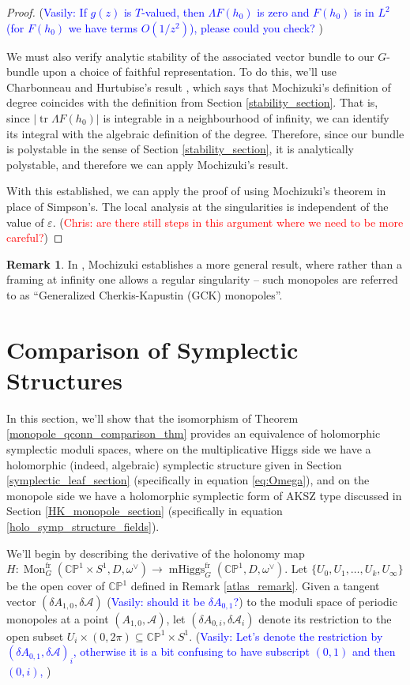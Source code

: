 \documentclass[11pt, oneside, reqno]{amsart}
\theoremstyle{definition} \newtheorem{definition}{Definition}[section]
\theoremstyle{definition} \newtheorem{remark}[definition]{Remark}
\theoremstyle{definition} \newtheorem{remarks}[definition]{Remarks}
\theoremstyle{definition} \newtheorem{question}[definition]{Question}
\theoremstyle{definition} \newtheorem*{note}{Note}
\theoremstyle{definition} \newtheorem{example}[definition]{Example}
\theoremstyle{definition} \newtheorem{examples}[definition]{Examples}
\newcommand{\bb}[1]{\mathbb{#1}}
\newcommand{\mc}[1]{\mathcal{#1}}
\newcommand{\eps}{\varepsilon}
\newcommand{\sub}{\subseteq}
\DeclareMathOperator{\tr}{tr}
\DeclareMathOperator{\mhiggs}{mHiggs}
\DeclareMathOperator{\mon}{Mon}
\newcommand{\fr}{\mathrm{fr}}
\newcommand{\chris}[1]{(\textcolor{red}{Chris: #1})}
\newcommand{\vasily}[1]{(\textcolor{blue}{Vasily: #1})}
\begin{document}
\begin{proof}
\vasily{If $g(z)$ is $T$-valued, then $\Lambda F(h_0)$ is zero and $ F(h_0)$ is in $L^2$ (for $F(h_0)$ we have terms $O(1/z^2)$), please could you check?  } 

We must also verify analytic stability of the associated vector bundle to our $G$-bundle upon a choice of faithful representation.  To do this, we'll use Charbonneau and Hurtubise's result \cite[Lemma 4.5]{CharbonneauHurtubise}, which says that Mochizuki's definition of degree coincides with the definition from Section \ref{stability_section}.  That is, since $|\tr \Lambda F(h_0)|$ is integrable in a neighbourhood of infinity, we can identify its integral with the algebraic definition of the degree.  Therefore, since our bundle is polystable in the sense of Section \ref{stability_section}, it is analytically polystable, and therefore we can apply Mochizuki's result.

With this established, we can apply the proof of \cite[Proposition 5.2]{Smith} using Mochizuki's theorem in place of Simpson's.  The local analysis at the singularities is independent of the value of $\eps$.
\chris{are there still steps in this argument where we need to be more careful?}
\end{proof}

\begin{remark}
In \cite{Mochizuki}, Mochizuki establishes a more general result, where rather than a framing at infinity one allows a regular singularity -- such monopoles are referred to as ``Generalized Cherkis-Kapustin (GCK) monopoles''.
\end{remark}

\section{Comparison of Symplectic Structures} \label{symp_comparison_section}

In this section, we'll show that the isomorphism of Theorem \ref{monopole_qconn_comparison_thm} provides an equivalence of holomorphic symplectic moduli spaces, where on the multiplicative Higgs side we have a holomorphic (indeed, algebraic) symplectic structure given in Section \ref{symplectic_leaf_section} (specifically in equation \ref{eq:Omega}), and on the monopole side we have a holomorphic symplectic form of AKSZ type discussed in Section \ref{HK_monopole_section} (specifically in equation \ref{holo_symp_structure_fields}).

We'll begin by describing the derivative of the holonomy map $H \colon \mon_G^\fr(\bb{CP}^1 \times S^1, D, \omega^\vee) \to \mhiggs^\fr_G(\bb{CP}^1, D, \omega^\vee)$. Let $\{U_0, U_1, \ldots, U_k, U_\infty\}$ be the open cover of $\bb{CP}^1$ defined in Remark \ref{atlas_remark}.  Given a tangent vector $(\delta A_{1,0}, \delta \mc A)$ \vasily{should it be $\delta A_{0,1}$?} to the moduli space of periodic monopoles at a point $(A_{1,0},\mc A)$, let $(\delta A_{0,i}, \delta \mc A_i)$ denote its restriction to the open subset $U_i \times (0, 2\pi) \sub \bb{CP}^1 \times S^1$. \vasily{Let's denote
  the restriction by $(\delta A_{{0,1}}, \delta \mathcal{A})_i$, otherwise
  it is a bit confusing to have subscript $(0,1)$ and then $(0,i)$,
 }
\end{document}
